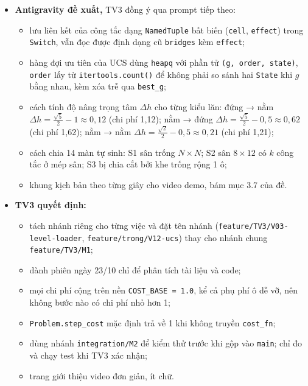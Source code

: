 \begin{itemize}
\tightlist
\item
  \textbf{Antigravity đề xuất,} TV3 đồng ý qua prompt tiếp theo:

  \begin{itemize}
  \tightlist
  \item
    lưu liên kết của công tắc dạng \texttt{NamedTuple} bất biến (\texttt{cell}, \texttt{effect}) trong \texttt{Switch}, vẫn đọc được định dạng cũ \texttt{bridges} kèm \texttt{effect};
  \item
    hàng đợi ưu tiên của UCS dùng \texttt{heapq} với phần tử \texttt{(g, order, state)}, \texttt{order} lấy từ \texttt{itertools.\allowbreak{}count()} để không phải so sánh hai \texttt{State} khi \(g\) bằng nhau, kèm xóa trễ qua \texttt{best\_\allowbreak{}g};
  \item
    cách tính độ nâng trọng tâm \(\Delta h\) cho từng kiểu lăn: đứng → nằm \(\Delta h = \frac{\sqrt{5}}{2} - 1 \approx 0{,}12\) (chi phí 1,12); nằm → đứng \(\Delta h = \frac{\sqrt{5}}{2} - 0{,}5 \approx 0{,}62\) (chi phí 1,62); nằm → nằm \(\Delta h = \frac{\sqrt{2}}{2} - 0{,}5 \approx 0{,}21\) (chi phí 1,21);
  \item
    cách chia 14 màn tự sinh: S1 sân trống \(N \times N\); S2 sân \(8 \times 12\) có \(k\) công tắc ở mép sân; S3 bị chia cắt bởi khe trống rộng 1 ô;
  \item
    khung kịch bản theo từng giây cho video demo, bám mục 3.7 của đề.
  \end{itemize}
\item
  \textbf{TV3 quyết định:}

  \begin{itemize}
  \tightlist
  \item
    tách nhánh riêng cho từng việc và đặt tên nhánh (\texttt{feature/\allowbreak{}TV3/\allowbreak{}V03-\allowbreak{}level-\allowbreak{}loader}, \texttt{feature/\allowbreak{}trong/\allowbreak{}V12-\allowbreak{}ucs}) thay cho nhánh chung \texttt{feature/\allowbreak{}TV3/\allowbreak{}M1};
  \item
    dành phiên ngày 23/10 chỉ để phân tích tài liệu và code;
  \item
    mọi chi phí cộng trên nền \texttt{COST\_\allowbreak{}BASE = 1.\allowbreak{}0}, kể cả phụ phí ô dễ vỡ, nên không bước nào có chi phí nhỏ hơn 1;
  \item
    \texttt{Problem.\allowbreak{}step\_\allowbreak{}cost} mặc định trả về 1 khi không truyền \texttt{cost\_\allowbreak{}fn};
  \item
    dùng nhánh \texttt{integration/\allowbreak{}M2} để kiểm thử trước khi gộp vào \texttt{main}; chỉ đo và chạy test khi TV3 xác nhận;
  \item
    trang giới thiệu video đơn giản, ít chữ.
  \end{itemize}
\end{itemize}


